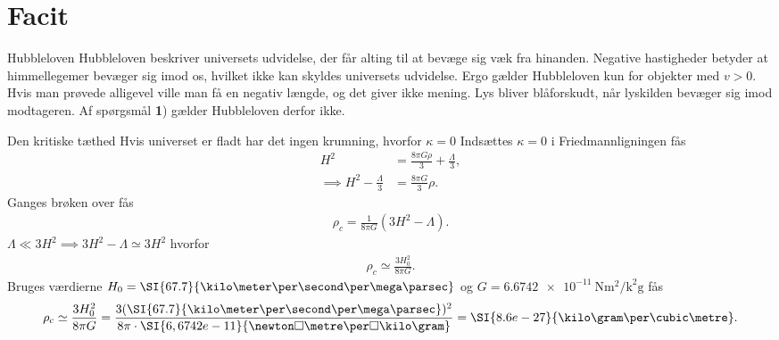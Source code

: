 \section{Facit}

\begin{opgave}{Hubbleloven}
    \opg Hubbleloven beskriver universets udvidelse, der får alting til at bevæge sig væk fra hinanden. Negative hastigheder betyder at himmellegemer bevæger sig imod os, hvilket ikke kan skyldes universets udvidelse. Ergo gælder Hubbleloven kun for objekter med $v > 0$. Hvis man prøvede alligevel ville man få en negativ længde, og det giver ikke mening.
    \opg Lys bliver blåforskudt, når lyskilden bevæger sig imod modtageren. Af spørgsmål \textbf{1}) gælder Hubbleloven derfor ikke.
\end{opgave}

\begin{opgave}{Den kritiske tæthed}
\opg Hvis universet er fladt har det ingen krumning, hvorfor $\kappa = 0$
\opg Indsættes $\kappa = 0$ i Friedmannligningen fås
%
\begin{align*}
    H^2 &= \frac{8\pi G \rho}{3} + \frac{\Lambda}{3}, \\
    \implies H^2 - \frac{\Lambda}{3} &= \frac{8\pi G}{3}\rho.
\end{align*}
%
Ganges brøken over fås
%
\begin{align*}
    \rho_c = \frac{1}{8\pi G}\left(3H^2 - \Lambda\right).
\end{align*}
%
\opg $\Lambda \ll 3H^2 \implies 3H^2 - \Lambda \simeq 3H^2$ hvorfor
%
\begin{align*}
    \rho_c \simeq \frac{3H_0^2}{8\pi G}.
\end{align*}
%
\opg Bruges værdierne $H_0 = \SI{67.7}{\kilo\meter\per\second\per\mega\parsec}$ og $G = \SI{6,6742e-11}{\newton\square\metre\per\square\kilo\gram}$ fås
%
\begin{align*}
    \rho_\text{c} \simeq \frac{3H_0^2}{8\pi G} = \frac{3(\SI{67.7}{\kilo\meter\per\second\per\mega\parsec})^2}{8\pi\cdot\SI{6,6742e-11}{\newton\square\metre\per\square\kilo\gram}} =  \SI{8.6e-27}{\kilo\gram\per\cubic\metre}.
\end{align*}
\end{opgave}

